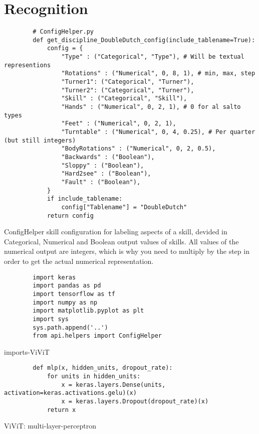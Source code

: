 \section{Recognition}
\label{sec:code-recognition}

\begin{listing}
    \begin{verbatim}
        # ConfigHelper.py
        def get_discipline_DoubleDutch_config(include_tablename=True):
            config = {
                "Type" : ("Categorical", "Type"), # Will be textual representions
                "Rotations" : ("Numerical", 0, 8, 1), # min, max, step
                "Turner1": ("Categorical", "Turner"),
                "Turner2": ("Categorical", "Turner"),
                "Skill" : ("Categorical", "Skill"),
                "Hands" : ("Numerical", 0, 2, 1), # 0 for al salto types
                "Feet" : ("Numerical", 0, 2, 1),
                "Turntable" : ("Numerical", 0, 4, 0.25), # Per quarter (but still integers)
                "BodyRotations" : ("Numerical", 0, 2, 0.5),
                "Backwards" : ("Boolean"),
                "Sloppy" : ("Boolean"),
                "Hard2see" : ("Boolean"),
                "Fault" : ("Boolean"),
            }
            if include_tablename:
                config["Tablename"] = "DoubleDutch"
            return config
    \end{verbatim}
    \caption[confighelper skill configuration]{ConfigHelper skill configuration for labeling aspects of a skill, devided in Categorical, Numerical and Boolean output values of skills. All values of the numerical output are integers, which is why you need to multiply by the step in order to get the actual numerical representation.}
    \label{code:confighelper}
\end{listing}

\begin{listing}
    \begin{verbatim}
        import keras
        import pandas as pd
        import tensorflow as tf
        import numpy as np
        import matplotlib.pyplot as plt
        import sys
        sys.path.append('..')
        from api.helpers import ConfigHelper
    \end{verbatim}
    \caption[imports-ViViT]{imports-ViViT}
    \label{code:imports-ViViT}
\end{listing}


\begin{listing}
    \begin{verbatim}
        def mlp(x, hidden_units, dropout_rate):
            for units in hidden_units:
                x = keras.layers.Dense(units, activation=keras.activations.gelu)(x)
                x = keras.layers.Dropout(dropout_rate)(x)
            return x
    \end{verbatim}
    \caption[mlp layer]{ViViT: multi-layer-perceptron}
    \label{code:mlp-layer}
\end{listing}


